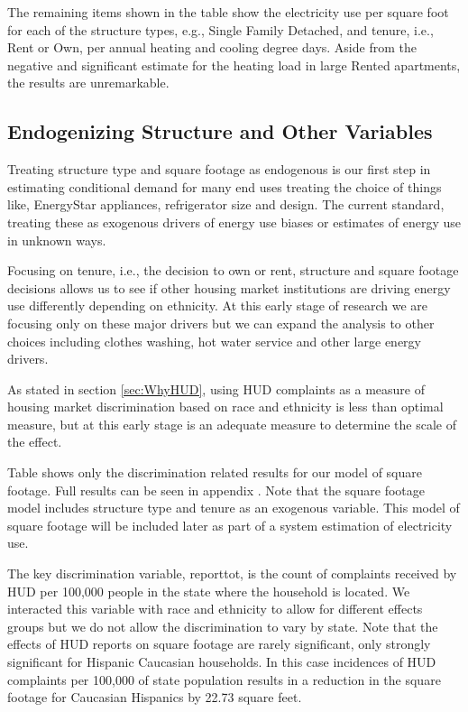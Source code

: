 \documentclass{article}
\begin{document}
The remaining items shown in the table show the electricity use per square foot for each of the structure types, e.g., Single Family Detached, and tenure, i.e., Rent or Own, per annual heating and cooling degree days.  Aside from the negative and significant estimate for the heating load in large Rented apartments, the results are unremarkable. 

\subsection{Endogenizing Structure and Other Variables}\label{sec:SingleEq}

Treating structure type and square footage as endogenous is our first step in estimating conditional demand for many end uses treating the choice of things like, EnergyStar appliances, refrigerator size and design.  The current standard, treating these as exogenous drivers of energy use biases or estimates of energy use in unknown ways.

Focusing on tenure, i.e., the decision to own or rent, structure and square footage decisions allows us to see if other housing market institutions are driving energy use differently depending on ethnicity.  At this early stage of research we are focusing only on these major drivers but we can expand the analysis to other choices including clothes washing, hot water service and other large energy drivers.

As stated in section \ref{sec:WhyHUD}, using HUD complaints as a measure of housing market discrimination based on race and ethnicity is less than optimal measure, but at this early stage is an adequate measure to determine the scale of the effect.  


Table 
shows only the discrimination related results for our model of square footage.  Full results can be seen in appendix 
.   Note that the square footage model includes structure type and tenure as an exogenous variable.  This model of square footage will be included later as part of a system estimation of electricity use.   

The key discrimination variable, reporttot, is the count of complaints received by HUD per 100,000 people in the state where the household is located. We interacted this variable with race and ethnicity to allow for different effects  groups but we do not allow the discrimination to vary by state. Note that the effects of HUD reports on square footage are rarely significant, only strongly significant for Hispanic Caucasian households.  In this case incidences of HUD complaints per 100,000 of state population results in a reduction in the square footage for Caucasian Hispanics by 22.73 square feet.
\end{document}
